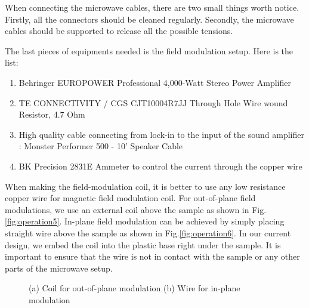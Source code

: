 When connecting the microwave cables, there are two small things worth notice. Firstly, all the connectors should be cleaned regularly. Secondly, the microwave cables should be supported to release all the possible tensions.

The last pieces of equipments needed is the field modulation setup. Here is the list:

\begin{enumerate}
  \item Behringer EUROPOWER Professional 4,000-Watt Stereo Power Amplifier 
  \item TE CONNECTIVITY / CGS CJT10004R7JJ  Through Hole Wire wound Resistor, 4.7 Ohm
  \item High quality cable connecting from lock-in to the input of the sound amplifier : Monster Performer 500 - 10' Speaker Cable
  \item BK Precision 2831E  Ammeter to control the current through the copper wire  
\end{enumerate}
  
 When making the field-modulation coil, it is better to use any low resistance copper wire for magnetic field modulation coil. For out-of-plane field modulations, we use an external coil above the sample as shown in Fig.\ref{fig:operation5}. In-plane field modulation can be achieved by simply placing straight wire above the sample as shown in Fig.\ref{fig:operation6}. In our current design, we embed the coil into the plastic base right under the sample. It is important to ensure that the wire is not in contact with the sample or any other parts of the microwave setup. 


\begin{figure}[t]
\centering
{}
\caption{(a) Coil for out-of-plane modulation (b) Wire for in-plane modulation}
\end{figure}

